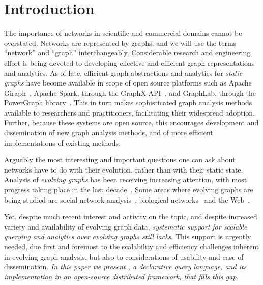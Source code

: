 \section{Introduction}
\label{sec:intro}

The importance of networks in scientific and commercial domains cannot
be overstated.  Networks are represented by graphs, and we will use
the terms ``network'' and ``graph'' interchangeably.  Considerable
research and engineering effort is being devoted to developing
effective and efficient graph representations and analytics.  As of
late, efficient graph abstractions and analytics for {\em static
  graphs} have become available in scope of open source platforms such
as Apache Giraph~\cite{ApacheGiraph}, Apache Spark, through the GraphX
API~\cite{DBLP:conf/osdi/GonzalezXDCFS14}, and GraphLab, through the
PowerGraph library~\cite{DBLP:conf/osdi/GonzalezLGBG12}.  This in turn
makes sophisticated graph analysis methods available to researchers
and practitioners, facilitating their widespread adoption.  Further,
because these systems are open source, this encourages development and
dissemination of new graph analysis methods, and of more efficient
implementations of existing methods.

Arguably the most interesting and important questions one can ask
about networks have to do with their evolution, rather than with their
static state.  Analysis of {\em evolving graphs} has been receiving
increasing attention, with most progress taking place in the last
decade~\cite{DBLP:journals/csur/AggarwalS14,Chan2008,Kan2009,DBLP:journals/tos/MiaoHLWYZPCC15,Ren2011,Semertzidis2015}.
Some areas where evolving graphs are being studied are social network
analysis~\cite{DBLP:conf/icwsm/GoetzLMF09,DBLP:journals/tweb/LeskovecAH07,DBLP:conf/kdd/LeskovecBKT08,DBLP:conf/icml/SarkarCJ12},
biological networks~\cite{DBLP:journals/tkdd/AsurPU09,DBLP:journals/tcsb/BeyerTLSF10,Stuart2003} and the Web~\cite{DBLP:journals/kais/ChanBL08,DBLP:journals/jisa/PapadimitriouDG10}.

Yet, despite much recent interest and activity on the topic, and
despite increased variety and availability of evolving graph data,
{\em systematic support for scalable querying and analytics over
  evolving graphs still lacks}.  This support is urgently needed, due
first and foremost to the scalability and efficiency challenges
inherent in evolving graph analysis, but also to considerations of
usability and ease of dissemination.  {\em In this paper we present
  \ql, a declarative query language, and its implementation in an
  open-source distributed framework, that fills this gap.}

